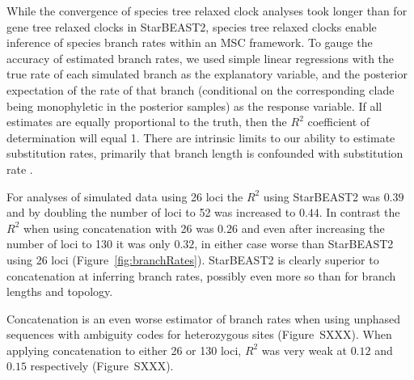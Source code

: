 \documentclass[nogrid]{MBE}%
\begin{document}
While the convergence of species tree relaxed clock analyses took longer than
for gene tree relaxed clocks in StarBEAST2, species tree relaxed clocks enable
inference of species branch rates within an MSC framework. To gauge the
accuracy of estimated branch rates, we used simple linear regressions with the
true rate of each simulated branch as the explanatory variable, and the
posterior expectation of the rate of that branch (conditional on the
corresponding clade being monophyletic in the posterior samples) as the
response variable. If all estimates are equally proportional to the truth,
then the $R^2$ coefficient of determination will equal 1. There are intrinsic
limits to our ability to estimate substitution rates, primarily that branch
length is confounded with substitution rate \citep{Thorne01092002}.

For analyses of simulated data using 26 loci the $R^2$ using StarBEAST2 was
$0.39$ and by doubling the number of loci to 52 was increased to $0.44$. In
contrast the $R^2$ when using concatenation with 26 was $0.26$ and even after
increasing the number of loci to 130 it was only $0.32$, in either case worse
than StarBEAST2 using 26 loci (Figure~\ref{fig:branchRates}). StarBEAST2 is
clearly superior to concatenation at inferring branch rates, possibly even
more so than for branch lengths and topology.

Concatenation is an even worse estimator of branch rates when using unphased
sequences with ambiguity codes for heterozygous sites (Figure~SXXX). When
applying concatenation to either 26 or 130 loci, $R^2$ was very weak at $0.12$ and
$0.15$ respectively (Figure~SXXX).
\end{document}
